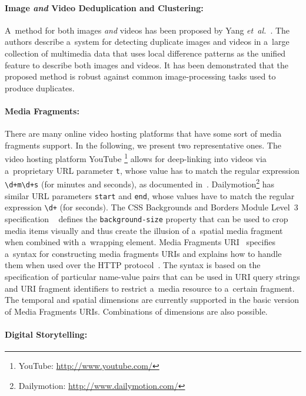 \paragraph{Image \emph{and} Video Deduplication and Clustering:}

A~method for both images \emph{and} videos
has been proposed by Yang \emph{et~al.}\ \cite{yang2009nearduplicate}.
The authors describe a~system for detecting duplicate images and videos
in a~large collection of multimedia data that uses local difference patterns
as the unified feature to describe both images and videos.
It has been demonstrated that the proposed method is robust against
common image-processing tasks used to produce duplicates.

\paragraph{Media Fragments:}

There are many online video hosting platforms
that have some sort of media fragments support.
In the following, we present two representative ones.
The video hosting platform YouTube%
\footnote{YouTube: \url{http://www.youtube.com/}}
allows for deep-linking into videos
via a~proprietary URL parameter \texttt{t},
whose value has to match the regular expression
\texttt{\textbackslash d+m\textbackslash d+s} (for minutes and seconds),
as documented in~\cite{youtube2008link}.
Dailymotion\footnote{Dailymotion: \url{http://www.dailymotion.com/}}
has similar URL parameters \texttt{start} and \texttt{end},
whose values have to match the regular expression
\texttt{\textbackslash d+} (for seconds).
The CSS Backgrounds and Borders Module Level~3 specification%
~\cite{bos2012css3} defines the \texttt{background-size} property
that can be used to crop media items visually
and thus create the illusion of a~spatial media fragment
when combined with a~wrapping element.
Media Fragments URI~\cite{troncy2012mediafragments}
specifies a~syntax for constructing media fragments URIs
and explains how to handle them
when used over the HTTP protocol~\cite{fielding1999http}.
The syntax is based on the specification of particular name-value pairs
that can be used in URI query strings and URI fragment identifiers
to restrict a~media resource to a~certain fragment.
The temporal and spatial dimensions are currently supported
in the basic version of Media Fragments URIs.
Combinations of dimensions are also possible.

\paragraph{Digital Storytelling:}

